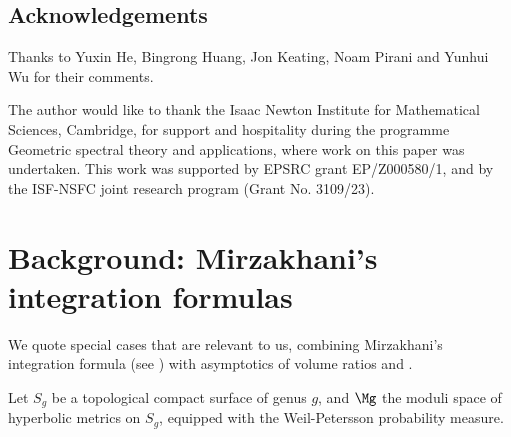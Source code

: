 \documentclass[12pt]{amsart}
\begin{document}
\subsection{Acknowledgements} 
Thanks to Yuxin He, Bingrong Huang, Jon Keating, Noam Pirani  and Yunhui Wu for their comments. 

  The author  would like to thank the Isaac Newton Institute for Mathematical Sciences, Cambridge, for support and hospitality during the programme Geometric spectral theory and applications, where work on this paper was undertaken. This work was supported by EPSRC grant EP/Z000580/1, and by the ISF-NSFC joint research program (Grant No. 3109/23). 





\section{Background: Mirzakhani's integration formulas}

We quote  special cases that are relevant to us, combining Mirzakhani's integration formula (see \cite[Theorem 2.2]{MP}) with asymptotics of volume ratios \cite[Proposition 3.1]{MP} and  \cite[Lemma 22]{NieWuXue}. 

Let $S_g$ be a topological compact surface of genus $g$, and $\Mg$ the moduli space of hyperbolic metrics on $S_g$, equipped with the Weil-Petersson probability measure. 



 
\end{document}
